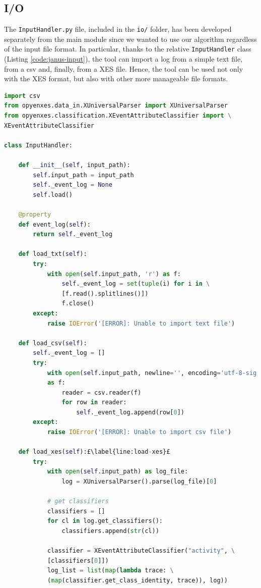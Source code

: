 \subsection{I/O}
The \texttt{InputHandler.py} file, included in the \texttt{io/} folder, has been developed separately from the main module since we wanted to use our algorithm regardless of the input file format. In particular, thanks to the relative \texttt{InputHandler} class (Listing \ref{code:janus-input}), the tool can import a log from a simple text file, from a csv and, finally, from a XES file. Hence, the \janus tool can be used not only with the XES format, but also with other more manageable file formats.
\begin{lstlisting}[language=Python, style=Python, escapechar = £, label={code:janus-input}, caption={The \texttt{InputHandler.py} module}]
import csv
from opyenxes.data_in.XUniversalParser import XUniversalParser
from opyenxes.classification.XEventAttributeClassifier import \
XEventAttributeClassifier

class InputHandler:

    def __init__(self, input_path):
        self.input_path = input_path
        self._event_log = None
        self.load()

    @property
    def event_log(self):
        return self._event_log

    def load_txt(self):
        try:
            with open(self.input_path, 'r') as f:
                self._event_log = set(tuple(i) for i in \
                [f.read().splitlines()])
                f.close()
        except:
            raise IOError('[ERROR]: Unable to import text file')

    def load_csv(self):
        self._event_log = []
        try:
            with open(self.input_path, newline='', encoding='utf-8-sig') \
            as f:
                reader = csv.reader(f)
                for row in reader:
                    self._event_log.append(row[0])
        except:
            raise IOError('[ERROR]: Unable to import csv file')

    def load_xes(self):£\label{line:load-xes}£
        try:
            with open(self.input_path) as log_file:
                log = XUniversalParser().parse(log_file)[0]

            # get classifiers
            classifiers = []
            for cl in log.get_classifiers():
                classifiers.append(str(cl))

            classifier = XEventAttributeClassifier("activity", \
            [classifiers[0]])
            log_list = list(map(lambda trace: \
            (map(classifier.get_class_identity, trace)), log))


\end{lstlisting}
